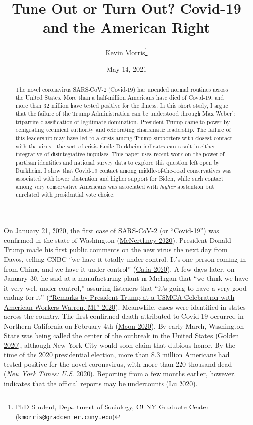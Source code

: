 \documentclass[
  12pt,
]{article}
\title{Tune Out or Turn Out? Covid-19 and the American Right}
\author{Kevin Morris\footnote{PhD Student, Department of Sociology, CUNY Graduate Center (\href{mailto:kmorris@gradcenter.cuny.edu}{\nolinkurl{kmorris@gradcenter.cuny.edu}})}}
\date{May 14, 2021}
\begin{document}
\maketitle
\begin{abstract}
The novel coronavirus SARS-CoV-2 (Covid-19) has upended normal routines across the United States. More than a half-million Americans have died of Covid-19, and more than 32 million have tested positive for the illness. In this short study, I argue that the failure of the Trump Administration can be understood through Max Weber's tripartite classification of legitimate domination. President Trump came to power by denigrating technical authority and celebrating charismatic leadership. The failure of this leadership may have led to a crisis among Trump supporters with closest contact with the virus---the sort of crisis Émile Durkheim indicates can result in either integrative of disintegrative impulses. This paper uses recent work on the power of partisan identities and national survey data to explore this question left open by Durkheim. I show that Covid-19 contact among middle-of-the-road conservatives was associated with lower abstention and higher support for Biden, while such contact among very conservative Americans was associated with \emph{higher} abstention but unrelated with presidential vote choice.
\end{abstract}

\pagebreak

\doublespacing

On January 21, 2020, the first case of SARS-CoV-2 (or ``Covid-19'') was confirmed in the state of Washington (\protect\hyperlink{ref-McNerthney2020}{McNerthney 2020}). President Donald Trump made his first public comments on the new virus the next day from Davos, telling CNBC ``we have it totally under control. It's one person coming in from China, and we have it under control'' (\protect\hyperlink{ref-Calia2020}{Calia 2020}). A few days later, on January 30, he said at a manufacturing plant in Michigan that ``we think we have it very well under control,'' assuring listeners that ``it's going to have a very good ending for it'' (\protect\hyperlink{ref-whitehouse2020}{{``Remarks by {President Trump} at a {USMCA Celebration} with {American Workers} \textbar{} {Warren}, {MI}''} 2020}). Meanwhile, cases were identified in states across the country. The first confirmed death attributed to Covid-19 occurred in Northern California on February 4th (\protect\hyperlink{ref-Moon2020}{Moon 2020}). By early March, Washington State was being called the center of the outbreak in the United States (\protect\hyperlink{ref-Golden2020}{Golden 2020}), although New York City would soon claim that dubious honor. By the time of the 2020 presidential election, more than 8.3 million Americans had tested positive for the novel coronavirus, with more than 220 thousand dead (\protect\hyperlink{ref-nyt2020}{\emph{New York Times: U.S.} 2020}). Reporting from a few months earlier, however, indicates that the official reports may be undercounts (\protect\hyperlink{ref-Lu2020}{Lu 2020}).
\end{document}
